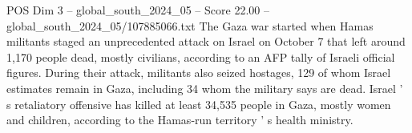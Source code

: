 \begin{textsample}{POS Dim 3 – global\_south\_2024\_05 – Score 22.00 – global\_south\_2024\_05/107885066.txt}
The Gaza war started when Hamas militants staged an unprecedented attack on Israel on October 7 that left around 1,170 people dead, mostly civilians, according to an AFP tally of Israeli official figures.
During their attack, militants also seized hostages, 129 of whom Israel estimates remain in Gaza, including 34 whom the military says are dead.
Israel ' s retaliatory offensive has killed at least 34,535 people in Gaza, mostly women and children, according to the Hamas-run territory ' s health ministry.

\end{textsample}
